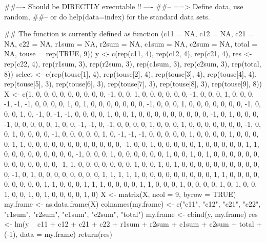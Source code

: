 \begin{Examples}
\begin{ExampleCode}
##---- Should be DIRECTLY executable !! ----
##-- ==>  Define data, use random,
##--    or do  help(data=index)  for the standard data sets.

## The function is currently defined as
function (c11 = NA, c12 = NA, c21 = NA, c22 = NA, r1sum = NA, 
    r2sum = NA, c1sum = NA, c2sum = NA, total = NA, touse = rep(TRUE, 
        9)) 
{
    y <- c(rep(c11, 4), rep(c12, 4), rep(c21, 4), res <- rep(c22, 
        4), rep(r1sum, 3), rep(r2sum, 3), rep(c1sum, 3), rep(c2sum, 
        3), rep(total, 8))
    select <- c(rep(touse[1], 4), rep(touse[2], 4), rep(touse[3], 
        4), rep(touse[4], 4), rep(touse[5], 3), rep(touse[6], 
        3), rep(touse[7], 3), rep(touse[8], 3), rep(touse[9], 
        8))
    X <- c(1, 0, 0, 0, 0, 0, 0, 0, 0, 0, -1, 0, 0, 1, 0, 0, 0, 
        0, 0, 0, -1, 0, 0, 0, 1, 0, 0, 0, -1, -1, -1, 0, 0, 0, 
        0, 1, 0, 1, 0, 0, 0, 0, 0, 0, 0, -1, 0, 0, 0, 1, 0, 0, 
        0, 0, 0, 0, 0, -1, 0, 0, 0, 1, 0, -1, 0, -1, -1, 0, 0, 
        0, 0, 1, 0, 0, 1, 0, 0, 0, 0, 0, 0, 0, 0, 0, -1, 0, 1, 
        0, 0, 0, -1, 0, 0, 0, 0, 0, 1, 0, 0, -1, -1, 0, -1, 0, 
        0, 0, 0, 1, 0, 0, 0, 1, 0, 0, 0, 0, 0, 0, 0, -1, 0, 0, 
        1, 0, 0, 0, 0, -1, 0, 0, 0, 0, 0, 1, 0, -1, -1, -1, 0, 
        0, 0, 0, 0, 1, 0, 0, 0, 0, 1, 0, 0, 0, 0, 1, 1, 0, 0, 
        0, 0, 0, 0, 0, 0, 0, 0, 0, 0, -1, 0, 0, 1, 0, 0, 0, 0, 
        0, 1, 0, 0, 0, 0, 0, 1, 1, 0, 0, 0, 0, 0, 0, 0, 0, 0, 
        -1, 0, 0, 0, 1, 0, 0, 0, 0, 0, 0, 1, 0, 0, 1, 0, 1, 0, 
        0, 0, 0, 0, 0, 0, 0, 0, 0, 0, 0, 0, -1, 1, 0, 0, 0, 0, 
        0, 0, 0, 1, 0, 0, 1, 0, 1, 0, 0, 0, 0, 0, 0, 0, 0, 0, 
        0, 0, -1, 0, 1, 0, 0, 0, 0, 0, 0, 0, 0, 1, 1, 1, 1, 1, 
        0, 0, 0, 0, 0, 0, 0, 0, 0, 1, 1, 0, 0, 0, 0, 0, 0, 0, 
        0, 0, 1, 1, 0, 0, 0, 1, 1, 1, 0, 0, 0, 0, 1, 1, 0, 0, 
        0, 1, 0, 0, 0, 0, 1, 0, 1, 0, 0, 1, 0, 0, 1, 0, 1, 0, 
        0, 0, 0, 1, 0)
    X <- matrix(X, ncol = 9, byrow = TRUE)
    my.frame <- as.data.frame(X)
    colnames(my.frame) <- c("c11", "c12", "c21", "c22", "r1sum", 
        "r2sum", "c1sum", "c2sum", "total")
    my.frame <- cbind(y, my.frame)
    res <- lm(y ~ c11 + c12 + c21 + c22 + r1sum + r2sum + c1sum + 
        c2sum + total + (-1), data = my.frame)
    return(res)
  }
\end{ExampleCode}
\end{Examples}

